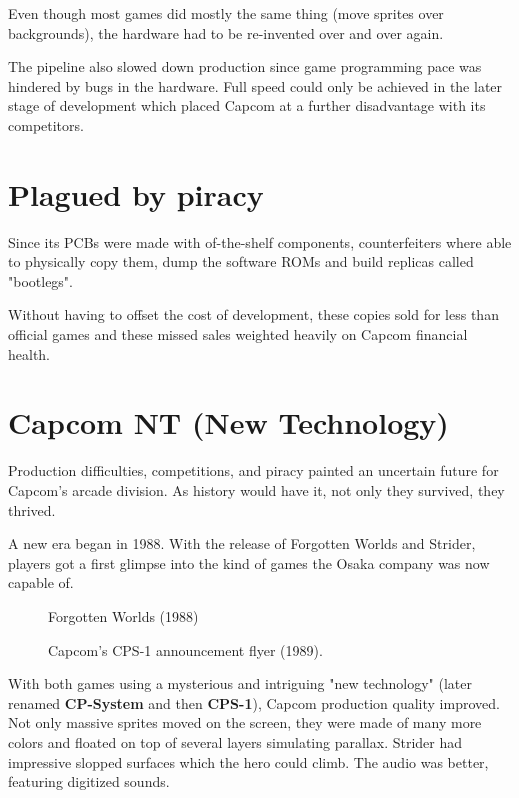 Even though most games did mostly the same thing (move sprites over backgrounds), the hardware had to be re-invented over and over again. 

The pipeline also slowed down production since game programming pace was hindered by bugs in the hardware. Full speed could only be achieved in the later stage of development which placed Capcom at a further disadvantage with its competitors.





\section{Plagued by piracy}
Since its PCBs were made with of-the-shelf components, counterfeiters where able to physically copy them, dump the software ROMs and build replicas called "bootlegs". 

Without having to offset the cost of development, these copies sold for less than official games and these missed sales weighted heavily on Capcom financial health. 




\section{Capcom NT (New Technology)}
Production difficulties, competitions, and piracy painted an uncertain future for Capcom's arcade division. As history would have it, not only they survived, they thrived.

A new era began in 1988. With the release of Forgotten Worlds and Strider, players got a first glimpse into the kind of games the Osaka company was now capable of.  



 \begin{figure}[H]
\caption*{Forgotten Worlds (1988)}
\end{figure}



 

  \begin{figure}[H]
  \caption*{Capcom's CPS-1 announcement flyer (1989).}
  \end{figure}

With both games using a mysterious and intriguing "new technology" (later renamed \textbf{CP-System} and then \textbf{CPS-1}), Capcom production quality improved. Not only massive sprites moved on the screen, they were made of many more colors and floated on top of several layers simulating parallax. Strider had impressive slopped surfaces which the hero could climb. The audio was better, featuring digitized sounds.

